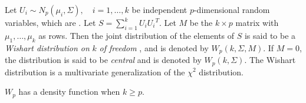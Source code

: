 \documentclass[12pt]{article}
\begin{document}
Let $U_i \sim  N_p(\mu_i, \Sigma ), \quad i=1,\ldots, k$ be independent $p$-dimensional random variables, which are
. 
Let $S= \sum_{i=1}^k U_i {U_i}^T$. Let $M$ be the $k\times p$ matrix
with $\mu_1, \ldots, \mu_k$ as rows. 
Then the joint distribution of the
elements of $S$ is said to be a \emph{Wishart distribution on} $k$ 
\emph{ of freedom }, and is 
denoted by $W_p(k, \Sigma, M)$. If $M=0$, the distribution is said to be
\emph{central} and is denoted by $W_p(k, \Sigma)$. 
The Wishart distribution is a multivariate generalization  of the $\chi^2$ distribution. 

$W_p$ has a density function when $k \geq p$. 
\end{document}

